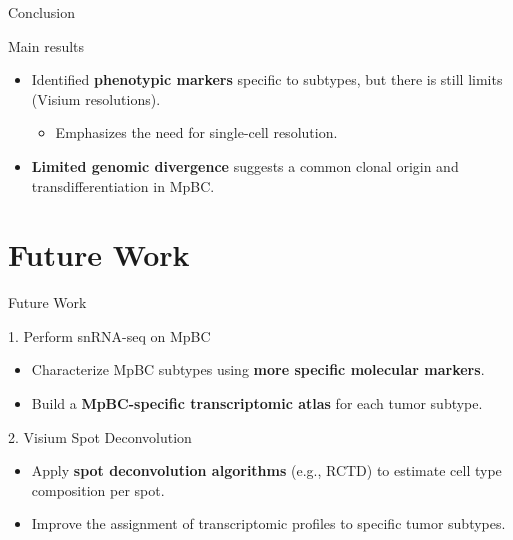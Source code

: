 \documentclass[aspectratio=169]{beamer}
\begin{document}
\begin{frame}{Conclusion}
    \begin{block}{Main results}
        \begin{itemize}
            \item Identified \textbf{phenotypic markers} specific to  subtypes, but there is still limits (Visium resolutions).
                \begin{itemize}
                \item Emphasizes the need for single-cell resolution.
                \end{itemize}
            \item \textbf{Limited genomic divergence} suggests a common clonal origin and transdifferentiation in MpBC.

        \end{itemize}
    \end{block}
\end{frame}


\section{Future Work}

\begin{frame}{Future Work}

    \begin{block}{1. Perform snRNA-seq on MpBC}
    \begin{itemize}
        \item Characterize MpBC subtypes using \textbf{more specific molecular markers}.
        \item Build a \textbf{MpBC-specific transcriptomic atlas} for each tumor subtype.
    \end{itemize}
    \end{block}

    \begin{block}{2. Visium Spot Deconvolution}
    \begin{itemize}
        \item Apply \textbf{spot deconvolution algorithms} (e.g., RCTD) to estimate cell type composition per spot.
        \item Improve the assignment of transcriptomic profiles to specific tumor subtypes.
    \end{itemize}
    \end{block}

\end{frame}
\end{document}
